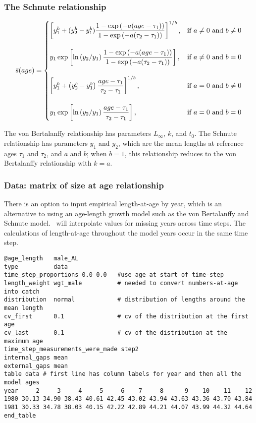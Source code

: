 \subsubsection{The Schnute relationship}\label{sec:AgeLength-Schnute}

\begin{equation}
\bar{s}(age)=\displaystyle\begin{cases}
  \left[ y_1^b + (y_2^b - y_1^b) \dfrac{1-\exp \left(-a(age - \tau_1) \right)}{1-\exp \left(-a(\tau_2 - \tau_1) \right)} \right]^{1/b}, & \text{if $a\ne0$ and $b\ne0$} \\
  \AddVspace
  y_1 \exp \left[ \ln \left( y_2 / y_1 \right) \dfrac{1-\exp \left(-a(age - \tau_1) \right)}{1-\exp \left(-a(\tau_2 - \tau_1) \right)} \right], & \text{if $a\ne0$ and $b=0$} \\
  \AddVspace
  \left[ y_1^b + \left( y_2^b - y_1^b \right) \dfrac{age-\tau_1}{\tau_2 - \tau_1} \right]^{1/b}, & \text{if $a=0$ and $b\ne0$} \\
  \AddVspace
  y_1 \exp \left[ \ln \left( y_2/y_1 \right) \dfrac{age-\tau_1}{\tau_2 - \tau_1} \right] , & \text{if $a=0$ and $b=0$} \\
  \end{cases}
\end{equation}

The von Bertalanffy relationship has parameters $L_\infty$, $k$, and $t_0$. The Schnute relationship \citep{836} has parameters $y_1$ and $y_2$, which are the mean lengths at reference ages $\tau_1$ and $\tau_2$, and $a$ and $b$; when $b=1$, this relationship reduces to the von Bertalanffy relationship with $k=a$.

\subsubsection{Data: matrix of size at age relationship}\label{sec:AgeLength-Data}

There is an option to input empirical length-at-age by year, which is an alternative to using an age-length growth model such as the von Bertalanffy and Schnute model. \CNAME\ will interpolate values for missing years across time steps. The calculations of length-at-age throughout the model years occur in the same time step.

{\small{\begin{verbatim}
@age_length   male_AL
type          data
time_step_proportions 0.0 0.0   #use age at start of time-step
length_weight wgt_male          # needed to convert numbers-at-age into catch
distribution  normal            # distribution of lengths around the mean length
cv_first      0.1               # cv of the distribution at the first age
cv_last       0.1               # cv of the distribution at the maximum age
time_step_measurements_were_made step2
internal_gaps mean
external_gaps mean
table data # first line has column labels for year and then all the model ages
year     2     3     4     5     6    7     8      9    10    11    12
1980 30.13 34.90 38.43 40.61 42.45 43.02 43.94 43.63 43.36 43.70 43.84
1981 30.33 34.78 38.03 40.15 42.22 42.89 44.21 44.07 43.99 44.32 44.64
end_table
\end{verbatim}}}

